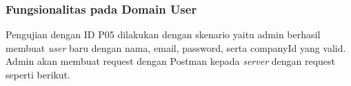 \subsubsection{Fungsionalitas pada Domain User}

Pengujian dengan ID P05 dilakukan dengan skenario yaitu admin berhasil membuat \textit{user} baru dengan nama, email, password, serta companyId yang valid. Admin akan membuat request dengan Postman kepada \textit{server} dengan request seperti berikut.







